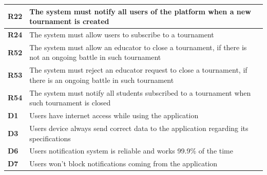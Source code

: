 \documentclass[../RASD.tex]{subfiles}
\begin{document}
\begin{table}[h!]
\begin{center}
\begin{tabular}{|m{2em}|m{30em}|}
                \hline
                \cellcolor{ReqMappingCell2}
                \textbf{R22} & The system must notify all users of the platform when a new tournament is created\\
                \hline
                \cellcolor{ReqMappingCell2}
                \textbf{R24} & The system must allow users to subscribe to a tournament\\
                \hline
                \cellcolor{ReqMappingCell2}
                \textbf{R52} & The system must allow an educator to close a tournament, if there is not an ongoing battle in such tournament\\
                \hline
                \cellcolor{ReqMappingCell2}
                \textbf{R53} & The system must reject an educator request to close a tournament, if there is an ongoing battle in such tournament\\
                \hline
                \cellcolor{ReqMappingCell2}
                \textbf{R54} & The system must notify all students subscribed to a tournament when such tournament is closed\\
                \hline
                \cellcolor{ReqMappingCell2}
                \textbf{D1} & Users have internet access while using the application\\
                \hline
                \cellcolor{ReqMappingCell3}
                \textbf{D3} & Users device always send correct data to the application regarding its specifications\\
                \hline
                \cellcolor{ReqMappingCell3}
                \textbf{D6} & Users notification system is reliable and works 99.9\% of the time\\
                \hline
                \cellcolor{ReqMappingCell3}
                \textbf{D7} & Users won't block notifications coming from the application\\
                \hline
                \end{tabular}
            \end{center}
        \end{table}\newpage
\end{document}
